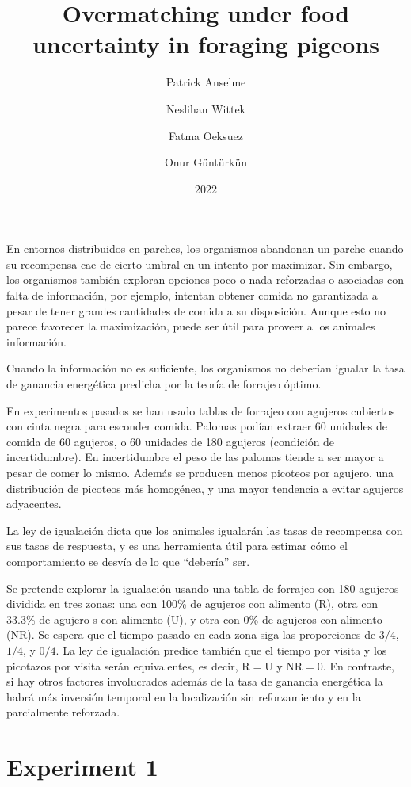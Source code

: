 \documentclass[a4paper,12pt]{article}
\title{Overmatching under food uncertainty in foraging pigeons}
\author{Patrick Anselme \and Neslihan Wittek \and Fatma Oeksuez \and Onur Güntürkün}
\date{2022}
\begin{document}
{\scshape\bfseries \maketitle}

En entornos distribuidos en parches, los organismos abandonan un parche cuando su recompensa cae de cierto umbral en un intento por maximizar. Sin embargo, los organismos también exploran opciones poco o nada reforzadas o asociadas con falta de información, por ejemplo, intentan obtener comida no garantizada a pesar de tener grandes cantidades de comida a su disposición.
Aunque esto no parece favorecer la maximización, puede ser útil para proveer a los animales información.

Cuando la información no es suficiente, los organismos no deberían igualar la tasa de ganancia energética predicha por la teoría de forrajeo óptimo.

En experimentos pasados se han usado tablas de forrajeo con agujeros cubiertos con cinta negra para esconder comida. Palomas podían extraer 60 unidades de comida de 60 agujeros, o 60 unidades de 180 agujeros (condición de incertidumbre). En incertidumbre el peso de las palomas tiende a ser mayor a pesar de comer lo mismo. Además se producen menos picoteos por agujero, una distribución de picoteos más homogénea, y una mayor tendencia a evitar agujeros adyacentes.

La ley de igualación dicta que los animales igualarán las tasas de recompensa con sus tasas de respuesta, y es una herramienta útil para estimar cómo el comportamiento se desvía de lo que ``debería'' ser.

Se pretende explorar la igualación usando una tabla de forrajeo con 180 agujeros dividida en tres zonas: una con 100\% de agujeros con alimento (R), otra con 33.3\% de agujero s con alimento (U), y otra con 0\% de agujeros con alimento (NR). Se espera que el tiempo pasado en cada zona siga las proporciones de $3/4$, $1/4$, y $0/4$. La ley de igualación predice también que el tiempo por visita y los picotazos por visita serán equivalentes, es decir, R$=$U y NR$=$0. En contraste, si hay otros factores involucrados además de la tasa de ganancia energética la habrá más inversión temporal en la localización sin reforzamiento y en la parcialmente reforzada.

\section{Experiment 1}
\end{document}
